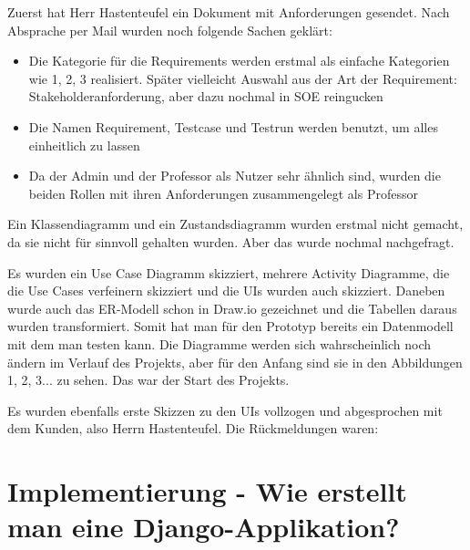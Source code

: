 \documentclass[11pt,a4paper]{report}
\begin{document}
Zuerst hat Herr Hastenteufel ein Dokument mit Anforderungen gesendet. Nach Absprache per Mail wurden noch folgende Sachen geklärt:
\begin{itemize}
\item Die Kategorie für die Requirements werden erstmal als einfache Kategorien wie 1, 2, 3 realisiert. Später vielleicht Auswahl aus der Art der Requirement: Stakeholderanforderung, aber dazu nochmal in SOE reingucken

\item Die Namen Requirement, Testcase und Testrun werden benutzt, um alles einheitlich zu lassen

\item Da der Admin und der Professor als Nutzer sehr ähnlich sind, wurden die beiden Rollen mit ihren Anforderungen zusammengelegt als Professor 
\end{itemize}


Ein Klassendiagramm und ein Zustandsdiagramm wurden erstmal nicht gemacht, da sie nicht für sinnvoll gehalten wurden. Aber das wurde nochmal nachgefragt.

Es wurden ein Use Case Diagramm skizziert, mehrere Activity Diagramme, die die Use Cases verfeinern skizziert und die UIs wurden auch skizziert. Daneben wurde auch das ER-Modell schon in Draw.io gezeichnet und die Tabellen daraus wurden transformiert. Somit hat man für den Prototyp bereits ein Datenmodell mit dem man testen kann. Die Diagramme werden sich wahrscheinlich noch ändern im Verlauf des Projekts, aber für den Anfang sind sie in den Abbildungen 1, 2, 3... zu sehen. Das war der Start des Projekts.

Es wurden ebenfalls erste Skizzen zu den UIs vollzogen und abgesprochen mit dem Kunden, also Herrn Hastenteufel.
Die Rückmeldungen waren:




\chapter{Implementierung - Wie erstellt man eine Django-Applikation?} \label{chap:einf}
\end{document}

